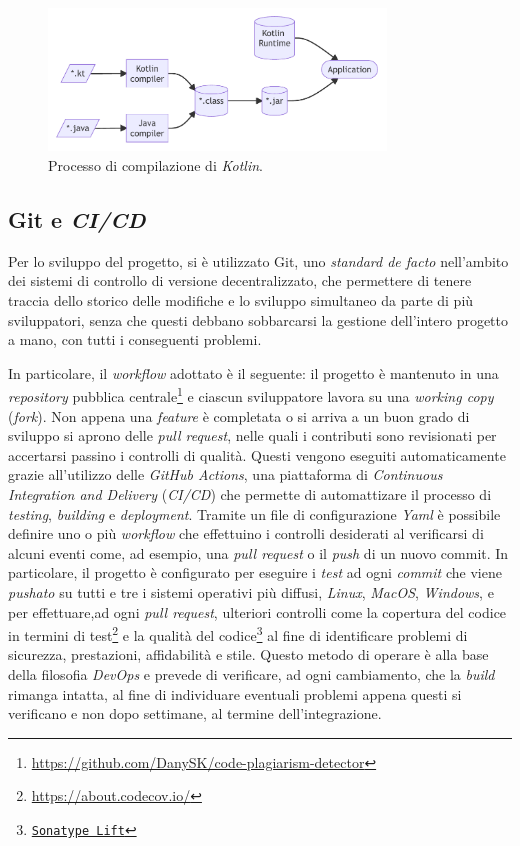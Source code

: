\begin{figure}[h]
    \centering
    \includegraphics[width=0.8\textwidth]{resources/img/03-kotlincompilation.pdf}
    \caption{Processo di compilazione di \textit{Kotlin}.}
    \label{img:03-kotlin-compilation}
\end{figure}

\subsection*{Git e \textit{CI/CD}}
\label{03-git-ci}
Per lo sviluppo del progetto, si è utilizzato Git, uno \textit{standard de facto} nell'ambito dei sistemi di controllo di versione decentralizzato, che permettere di tenere traccia dello storico delle modifiche e lo sviluppo simultaneo da parte di più sviluppatori, senza che questi debbano sobbarcarsi la gestione dell'intero progetto a mano, con tutti i conseguenti problemi.

In particolare, il \textit{workflow} adottato è il seguente: il progetto è mantenuto in una \textit{repository} pubblica centrale\footnote{\url{https://github.com/DanySK/code-plagiarism-detector}} e ciascun sviluppatore lavora su una \textit{working copy} (\textit{fork}).
%
Non appena una \textit{feature} è completata o si arriva a un buon grado di sviluppo si aprono delle \textit{pull request}, nelle quali i contributi sono revisionati per accertarsi passino i controlli di qualità.
%
Questi vengono eseguiti automaticamente grazie all'utilizzo delle \textit{GitHub Actions}, una piattaforma di \textit{Continuous Integration and Delivery} (\textit{CI/CD}) che permette di automattizare il processo di \textit{testing}, \textit{building} e \textit{deployment}.
%
Tramite un file di configurazione \textit{Yaml} è possibile definire uno o più \textit{workflow} che effettuino i controlli desiderati al verificarsi di alcuni eventi come, ad esempio, una \textit{pull request} o il \textit{push} di un nuovo commit.
%
In particolare, il progetto è configurato per eseguire i \textit{test} ad ogni \textit{commit} che viene \textit{pushato} su tutti e tre i sistemi operativi più diffusi, \textit{Linux}, \textit{MacOS}, \textit{Windows}, e per effettuare,ad ogni \textit{pull request}, ulteriori controlli come la copertura del codice in termini di test\footnote{\url{https://about.codecov.io/}} e la qualità del codice\footnote{\href{shorturl.at/enwzD}{\texttt{Sonatype Lift}}} al fine di identificare problemi di sicurezza, prestazioni, affidabilità e stile.
%
Questo metodo di operare è alla base della filosofia \textit{DevOps} e prevede di verificare, ad ogni cambiamento, che la \textit{build} rimanga intatta, al fine di individuare eventuali problemi appena questi si verificano e non dopo settimane, al termine dell'integrazione.

